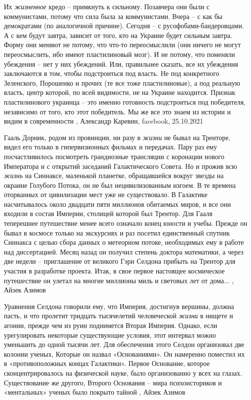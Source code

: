 Их \emph{жизненное} кредо – примкнуть к сильному. Позавчера они были с
коммунистами, потому что сила была  за коммунистами. Вчера –  с как бы
демократами (по аналогичной причине). Сегодня –  с русофобами-бандеровцами. А с
кем будут завтра, зависит от того, кто на Украине будет сильным завтра.  Форму
они меняют не потому, что что-то переосмыслили (они ничего не могут
переосмыслить, ибо имеют пластилиновый мозг). И не потому, что поменяли
убеждения – нет у них убеждений. Или, правильнее сказать, все их убеждения
заключаются в том, чтобы подстроиться под власть. Не под конкретного
Зеленского, Порошенко и прочих (те все тоже пластилиновые), а под реальную
власть, центр которой, по всей видимости, не на Украине находится.  Признак
пластилинового украинца – это именно готовность подстроиться под победителя,
независимо от того, кто этот победитель. Мы же все это знаем из истории и видим
в современности
, Александр Каревин, facebook, 25.10.2021%

Гааль Дорник, родом из провинции, ни разу в \emph{жизни} не бывал на Тренторе, видел
его только в гипервизионных фильмах и передачах. Пару раз ему посчастливилось
посмотреть грандиозные трансляции с коронации нового Императора и с открытий
заседаний Галактического Совета. Но и прожив всю \emph{жизнь} на Синнаксе, маленькой
планетке, обращавшейся вокруг звезды на окраине Голубого Потока, он не был
нецивилизованным изгоем. В те времена оторванных от цивилизации мест уже не
существовало.  В Галактике насчитывалось около двадцати пяти миллионов
обитаемых миров, и все они входили в состав Империи, столицей которой был
Трентор.  Для Гааля теперешнее путешествие менее всего означало конец юности и
учебы.  Прежде он бывал в космосе только на экскурсиях и раз посетил
единственный спутник Синнакса с целью сбора данных о метеорном потоке,
необходимых ему в работе над диссертацией. Месяц назад он получил степень
доктора математики, а через две недели – приглашение от великого Гэри Селдона
прибыть на Трентор для участия в разработке проекта.  Итак, в свое первое
настоящее космическое путешествие он улетал на многие миллионы миль и световых
лет от дома...
, Айзек Азимов

Уравнения Селдона говорили ему, что Империя, достигнув вершины, должна пасть, и
что пролетит тридцать тысячелетий человеческой \emph{жизни} в нищете и агонии, прежде
чем из руин поднимется Вторая Империя. Однако, если урегулировать некоторые
существующие условия, этот интервал можно уменьшить до одной тысячи лет.  Для
обеспечения этого Селдон организовал две колонии ученых, Которые он назвал
«Основаниями». Он намеренно поместил их в «противоположных концах Галактики».
Первое Основание, которое сконцентрировалось на физической науке, было
организованно у всех на глазах. Существование же другого, Второго Основания –
мира психоисториков и «ментальных» ученых было покрыто тайной
, Айзек Азимов

